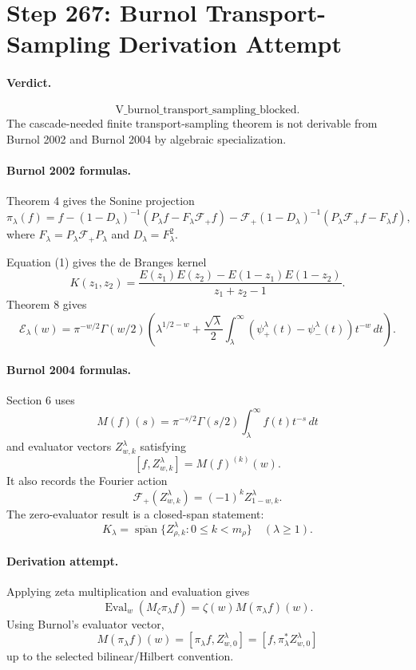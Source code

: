 \section*{Step 267: Burnol Transport-Sampling Derivation Attempt}

\paragraph{Verdict.}
\[
\mathrm{V\_burnol\_transport\_sampling\_blocked}.
\]
The cascade-needed finite transport-sampling theorem is not derivable from
Burnol 2002 and Burnol 2004 by algebraic specialization.

\paragraph{Burnol 2002 formulas.}
Theorem 4 gives the Sonine projection
\[
\pi_\lambda(f)=f-(1-D_\lambda)^{-1}(P_\lambda f-F_\lambda\mathcal F_+f)
-\mathcal F_+(1-D_\lambda)^{-1}(P_\lambda\mathcal F_+f-F_\lambda f),
\]
where \(F_\lambda=P_\lambda\mathcal F_+P_\lambda\) and
\(D_\lambda=F_\lambda^2\).

Equation (1) gives the de Branges kernel
\[
K(z_1,z_2)=
\frac{E(z_1)E(z_2)-E(1-z_1)E(1-z_2)}{z_1+z_2-1}.
\]
Theorem 8 gives
\[
\mathcal E_\lambda(w)=
\pi^{-w/2}\Gamma(w/2)\left(
\lambda^{1/2-w}+\frac{\sqrt{\lambda}}{2}
\int_\lambda^\infty
(\psi_+^\lambda(t)-\psi_-^\lambda(t))t^{-w}\,dt
\right).
\]

\paragraph{Burnol 2004 formulas.}
Section 6 uses
\[
M(f)(s)=\pi^{-s/2}\Gamma(s/2)\int_\lambda^\infty f(t)t^{-s}\,dt
\]
and evaluator vectors \(Z^\lambda_{w,k}\) satisfying
\[
[f,Z^\lambda_{w,k}]=M(f)^{(k)}(w).
\]
It also records the Fourier action
\[
\mathcal F_+(Z^\lambda_{w,k})=(-1)^k Z^\lambda_{1-w,k}.
\]
The zero-evaluator result is a closed-span statement:
\[
K_\lambda=
\overline{\operatorname{span}}\{Z^\lambda_{\rho,k}:0\leq k<m_\rho\}
\quad(\lambda\geq1).
\]

\paragraph{Derivation attempt.}
Applying zeta multiplication and evaluation gives
\[
\operatorname{Eval}_w(M_\zeta\pi_\lambda f)
=\zeta(w)M(\pi_\lambda f)(w).
\]
Using Burnol's evaluator vector,
\[
M(\pi_\lambda f)(w)=[\pi_\lambda f,Z^\lambda_{w,0}]
=[f,\pi_\lambda^\ast Z^\lambda_{w,0}]
\]
up to the selected bilinear/Hilbert convention.

